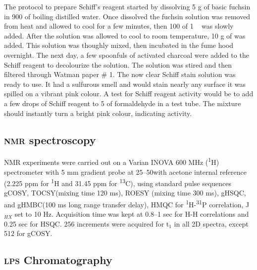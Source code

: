   The protocol to prepare Schiff's reagent started by dissolving 5 \si{\gram} of basic fuchsin in
  900 \millilitre of boiling distilled water. Once dissolved the fuchsin solution was removed from
  heat and allowed to cool for a few minutes, then 100 \millilitre of 1 \si{\molar}\  was
  slowly added. After the solution was allowed to cool to room temperature, 10 \si{\gram} of
   was added. This solution was thoughly mixed, then incubated in the fume hood
  overnight. The next day, a few spoonfuls of activated charcoal were added to the Schiff reagent to
  decolourize the solution. The solution was stired and then filtered through Watman paper \# 1. The
  now clear Schiff stain solution was ready to use. It had a sulfurous smell and would stain nearly
  any surface it was spilled on a vibrant pink colour. A test for Schiff reagent activity would be
  to add a few drops of Schiff reagent to 5 \millilitre of formaldehyde in a test tube. The mixture
  should instantly turn a bright pink colour, indicating activity.

	\subsection{\textsc{nmr} spectroscopy} %
	\label{sub:nmr_spectroscopy}

  \ac{NMR} experiments were carried out on a Varian INOVA 600 \si{\mega\hertz}
  (\textsuperscript{1}H) spectrometer with 5 \si{\milli\meter} gradient probe at 25--50\cel with
  acetone internal reference (2.225 ppm for \textsuperscript{1}H and 31.45 ppm for
  \textsuperscript{13}C), using standard pulse sequences \ac{gCOSY}, \ac{TOCSY}(mixing time 120
  \si{\milli\second}), \ac{ROESY} (mixing time 300 \si{\milli\second}), \ac{gHSQC}, and
  \ac{gHMBC}(100 \si{\milli\second} long range transfer delay), \ac{HMQC} for
  \textsuperscript{1}H-\textsuperscript{31}P correlation, J$_{HX}$ set to 10
  \si{\hertz}. Acquisition time was kept at 0.8--1 sec for H-H correlations and 0.25 sec for
  \ac{HSQC}. 256 increments were acquired for t$_1$ in all 2D spectra, except 512 for \ac{gCOSY}.

	\subsection{\textsc{lps} Chromatography} %
	\label{sub:chromatography}

